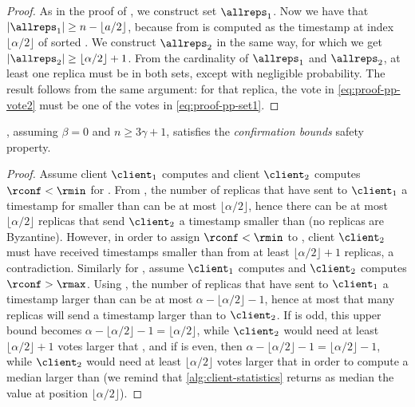 \begin{proof}

	As in the proof of , we construct set $\allreps_1$. Now we have that $|\allreps_1| \geq n - \lfloor a/2 \rfloor$, because from  \rperf is computed as the timestamp at index $\lfloor \alpha / 2 \rfloor$ of sorted \mrt.
	We construct $\allreps_2$ in the same way, for which we get $|\allreps_2| \geq \lfloor \alpha/2 \rfloor + 1$.
	From the cardinality of $\allreps_1$ and $\allreps_2$, at least one replica must be in both sets, except with negligible probability.
	The result follows from the same argument:
	for that replica, the vote in \cref{eq:proof-pp-vote2} must be one of the votes in \cref{eq:proof-pp-set1}.
\end{proof}


\begin{lemma}\label{lem:bounds-safety-crash}
	, assuming $\beta = 0$ and $n \geq 3 \gamma + 1$, satisfies the \emph{confirmation bounds} safety property.
\end{lemma}
\begin{proof}
	Assume client $\client_1$ computes \rmin and client $\client_2$ computes $\rconf < \rmin$ for \tx.
	From , the number of replicas that have sent to $\client_1$ a timestamp for \tx smaller than \rmin can be  at most $\lfloor \alpha / 2 \rfloor$,
	hence there can be at most $\lfloor \alpha / 2 \rfloor$ replicas that send $\client_2$  a timestamp smaller than \rmin (no replicas are Byzantine).
	However, in order to assign $\rconf < \rmin$ to \tx, client $\client_2$ must have received timestamps smaller than \rmin from at least $\lfloor \alpha / 2 \rfloor + 1$ replicas, a contradiction.
	Similarly for \rmax, assume $\client_1$ computes \rmax and $\client_2$ computes $\rconf > \rmax$.
	Using , the number of replicas that have sent to  $\client_1$ a timestamp larger than \rmax can be at most $\alpha - \lfloor \alpha / 2 \rfloor - 1$,
	hence at most that many replicas will send a timestamp larger than \rmax to $\client_2$.
	If \alpha is odd, this upper bound becomes $\alpha - \lfloor \alpha / 2 \rfloor -1 = \lfloor \alpha / 2 \rfloor $, while $\client_2$ would need at least
	$\lfloor \alpha / 2 \rfloor + 1$ votes larger that \rmax,
	and if \alpha is even, then $\alpha - \lfloor \alpha / 2 \rfloor - 1 = \lfloor \alpha / 2 \rfloor - 1$, while $\client_2$ would need at least
	$\lfloor \alpha / 2 \rfloor$ votes larger that \rmax in order to
	compute a median larger than \rmax (we remind that \cref{alg:client-statistics} returns as median the value at position $\lfloor \alpha /  2 \rfloor$).
\end{proof}

